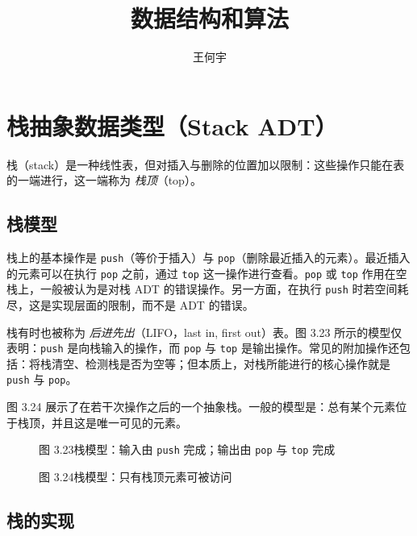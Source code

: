 \documentclass[a4paper]{ctexart}
\title{数据结构和算法}
\author{王何宇}
\date{}
\theoremstyle{definition}
\theoremstyle{definition}
\begin{document}
\maketitle
\pagestyle{empty}

\section{栈抽象数据类型（Stack ADT）}

\noindent
栈（stack）是一种线性表，但对插入与删除的位置加以限制：这些操作只能在表的一端进行，这一端称为 \emph{栈顶}（top）。

\subsection{栈模型}

\noindent
栈上的基本操作是 \texttt{push}（等价于插入）与 \texttt{pop}（删除最近插入的元素）。最近插入的元素可以在执行 \texttt{pop} 之前，通过 \texttt{top} 这一操作进行查看。\texttt{pop} 或 \texttt{top} 作用在空栈上，一般被认为是对栈 ADT 的错误操作。另一方面，在执行 \texttt{push} 时若空间耗尽，这是实现层面的限制，而不是 ADT 的错误。

\noindent
栈有时也被称为 \emph{后进先出}（LIFO，last in, first out）表。图 3.23 所示的模型仅表明：\texttt{push} 是向栈输入的操作，而 \texttt{pop} 与 \texttt{top} 是输出操作。常见的附加操作还包括：将栈清空、检测栈是否为空等；但本质上，对栈所能进行的核心操作就是 \texttt{push} 与 \texttt{pop}。

\noindent
图 3.24 展示了在若干次操作之后的一个抽象栈。一般的模型是：总有某个元素位于栈顶，并且这是唯一可见的元素。

\begin{figure}[h]
  \centering
  \caption{图 3.23\quad 栈模型：输入由 \texttt{push} 完成；输出由 \texttt{pop} 与 \texttt{top} 完成}
\end{figure}

\begin{figure}[h]
  \centering
  \caption{图 3.24\quad 栈模型：只有栈顶元素可被访问}
\end{figure}

\subsection{栈的实现}
\end{document}
